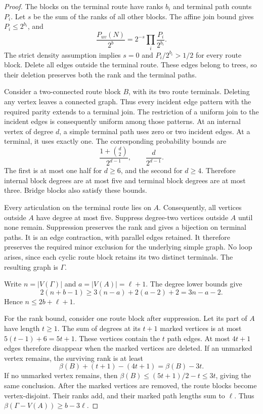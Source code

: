 \begin{proof}
The blocks on the terminal route have ranks $b_i$ and terminal path counts $P_i$.
Let $s$ be the sum of the ranks of all other blocks.
The affine join bound gives $P_i\le2^{b_i}$, and
\[
 \frac{P_{uv}(N)}{2^b}=2^{-s}\prod_i\frac{P_i}{2^{b_i}}.
\]
The strict density assumption implies $s=0$ and $P_i/2^{b_i}>1/2$ for every route block.
Delete all edges outside the terminal route.
These edges belong to trees, so their deletion preserves both the rank and the terminal paths.

Consider a two-connected route block $B$, with its two route terminals.
Deleting any vertex leaves a connected graph.
Thus every incident edge pattern with the required parity extends to a terminal join.
The restriction of a uniform join to the incident edges is consequently uniform among those patterns.
At an internal vertex of degree $d$, a simple terminal path uses zero or two incident edges.
At a terminal, it uses exactly one.
The corresponding probability bounds are
\[
 \frac{1+\binom d2}{2^{d-1}},\qquad \frac{d}{2^{d-1}}.
\]
The first is at most one half for $d\ge6$, and the second for $d\ge4$.
Therefore internal block degrees are at most five and terminal block degrees are at most three.
Bridge blocks also satisfy these bounds.

Every articulation on the terminal route lies on $A$.
Consequently, all vertices outside $A$ have degree at most five.
Suppress degree-two vertices outside $A$ until none remain.
Suppression preserves the rank and gives a bijection on terminal paths.
It is an edge contraction, with parallel edges retained.
It therefore preserves the required minor exclusion for the underlying simple graph.
No loop arises, since each cyclic route block retains its two distinct terminals.
The resulting graph is $\Gamma$.

Write $n=|V(\Gamma)|$ and $a=|V(A)|=\ell+1$.
The degree lower bounds give
\[
 2(n+b-1)\ge3(n-a)+2(a-2)+2=3n-a-2.
\]
Hence $n\le2b+\ell+1$.

For the rank bound, consider one route block after suppression.
Let its part of $A$ have length $t\ge1$.
The sum of degrees at its $t+1$ marked vertices is at most $5(t-1)+6=5t+1$.
These vertices contain the $t$ path edges.
At most $4t+1$ edges therefore disappear when the marked vertices are deleted.
If an unmarked vertex remains, the surviving rank is at least
\[
 \beta(B)+(t+1)-(4t+1)=\beta(B)-3t.
\]
If no unmarked vertex remains, then
$\beta(B)\le(5t+1)/2-t\le3t$, giving the same conclusion.
After the marked vertices are removed, the route blocks become vertex-disjoint.
Their ranks add, and their marked path lengths sum to $\ell$.
Thus $\beta(\Gamma-V(A))\ge b-3\ell$.
\end{proof}

